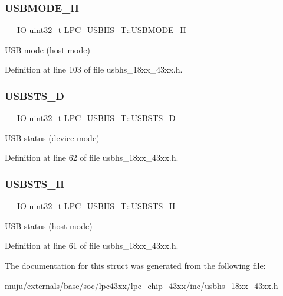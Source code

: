 \subsubsection{\texorpdfstring{U\+S\+B\+M\+O\+D\+E\+\_\+H}{USBMODE\_H}}
{\footnotesize\ttfamily \hyperlink{core__sc300_8h_aec43007d9998a0a0e01faede4133d6be}{\+\_\+\+\_\+\+IO} uint32\+\_\+t L\+P\+C\+\_\+\+U\+S\+B\+H\+S\+\_\+\+T\+::\+U\+S\+B\+M\+O\+D\+E\+\_\+H}

U\+SB mode (host mode) 

Definition at line 103 of file usbhs\+\_\+18xx\+\_\+43xx.\+h.

\mbox{\label{struct_l_p_c___u_s_b_h_s___t_a70ecdb6ad5a6faf72e9699e947476984}} 
\subsubsection{\texorpdfstring{U\+S\+B\+S\+T\+S\+\_\+D}{USBSTS\_D}}
{\footnotesize\ttfamily \hyperlink{core__sc300_8h_aec43007d9998a0a0e01faede4133d6be}{\+\_\+\+\_\+\+IO} uint32\+\_\+t L\+P\+C\+\_\+\+U\+S\+B\+H\+S\+\_\+\+T\+::\+U\+S\+B\+S\+T\+S\+\_\+D}

U\+SB status (device mode) 

Definition at line 62 of file usbhs\+\_\+18xx\+\_\+43xx.\+h.

\mbox{\label{struct_l_p_c___u_s_b_h_s___t_a9f3177408908a0e4e66a38da36b0426a}} 
\subsubsection{\texorpdfstring{U\+S\+B\+S\+T\+S\+\_\+H}{USBSTS\_H}}
{\footnotesize\ttfamily \hyperlink{core__sc300_8h_aec43007d9998a0a0e01faede4133d6be}{\+\_\+\+\_\+\+IO} uint32\+\_\+t L\+P\+C\+\_\+\+U\+S\+B\+H\+S\+\_\+\+T\+::\+U\+S\+B\+S\+T\+S\+\_\+H}

U\+SB status (host mode) 

Definition at line 61 of file usbhs\+\_\+18xx\+\_\+43xx.\+h.



The documentation for this struct was generated from the following file\+:\begin{DoxyCompactItemize}
\item 
muju/externals/base/soc/lpc43xx/lpc\+\_\+chip\+\_\+43xx/inc/\hyperlink{usbhs__18xx__43xx_8h}{usbhs\+\_\+18xx\+\_\+43xx.\+h}\end{DoxyCompactItemize}
